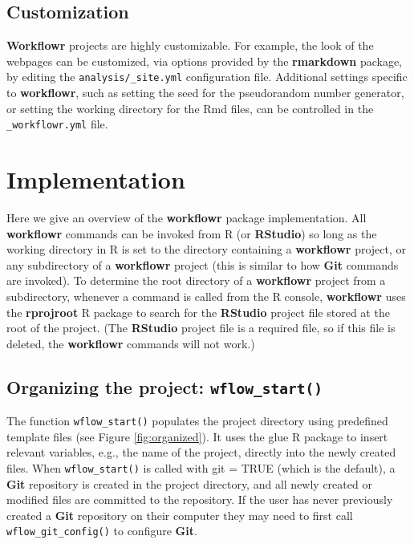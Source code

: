 \documentclass[9pt,a4paper]{extarticle}
\begin{document}
\subsection*{Customization}

 \textbf{Workflowr} projects are highly customizable. For example, the look of the
webpages can be customized, via options provided by the \textbf{rmarkdown}
package, by editing the \verb|analysis/_site.yml| configuration file.
Additional settings specific to \textbf{workflowr}, such as setting the seed for
the pseudorandom number generator, or setting the working directory for
the Rmd files, can be controlled in the \verb|_workflowr.yml| file.


\section*{Implementation}

Here we give an overview of the \textbf{workflowr} package implementation. All \textbf{workflowr} commands can be invoked from R (or \textbf{RStudio}) so long as the working directory in R is set to the directory containing a \textbf{workflowr} project, or any subdirectory of a \textbf{workflowr} project (this is similar to how \textbf{Git} commands are invoked). To determine the root directory of a \textbf{workflowr} project from a subdirectory, whenever a command is called from the R console, \textbf{workflowr} uses the \textbf{rprojroot} \cite{rprojroot} R package to search for the \textbf{RStudio} project file stored at the root of the project. (The \textbf{RStudio} project file is a required file, so if this file is deleted, the \textbf{workflowr} commands will not work.)

\subsection*{Organizing the project: \texttt{wflow\_start()}}

The function \texttt{wflow\_start()} populates the project directory using
predefined template files (see Figure \ref{fig:organized}). It uses the glue R package to
insert relevant variables, e.g., the name of the project, directly into
the newly created files. When \texttt{wflow\_start()} is called with git = TRUE
(which is the default), a \textbf{Git} repository is created in the project
directory, and all newly created or modified files are committed to the
repository. If the user has never previously created a \textbf{Git} repository on
their computer they may need to first call \texttt{wflow\_git\_config()} to
configure \textbf{Git}.
\end{document}
